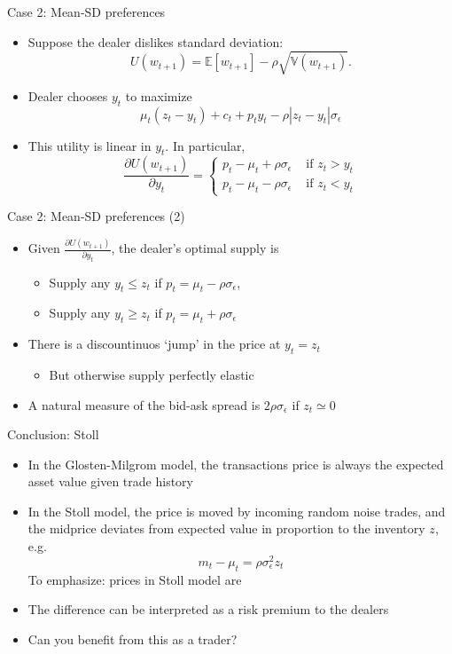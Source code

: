 \documentclass[english,10pt
,aspectratio=169
]{beamer}
\begin{document}
\begin{frame}{Case 2: Mean-SD preferences}
	\begin{itemize}
		\item Suppose the dealer dislikes standard deviation:
		\[
		U(w_{t+1})=\mathbb{E}[w_{t+1}] - \rho \sqrt{\mathbb{V}(w_{t+1})}.
		\]
		\item Dealer chooses $y_t$ to maximize
		\[
		\mu_t (z_t - y_t) + c_t + p_t y_t - \rho |z_t - y_t|\sigma_\epsilon
		\]
		\item This utility is linear in $y_t$. In particular,
		\[
		\frac{\partial U(w_{t+1})}{\partial y_t}= \left\{
		\begin{aligned}
		p_t-\mu_t+\rho\sigma_{\epsilon}	& \text{ if } z_t>y_t \\
		p_t-\mu_t-\rho\sigma_{\epsilon}	& \text{ if } z_t<y_t 
		\end{aligned}
		\right.
		\]
	\end{itemize}
\end{frame}


\begin{frame}{Case 2: Mean-SD preferences (2)}
	\begin{itemize}
		\item Given $\frac{\partial U(w_{t+1})}{\partial y_t}$, the dealer's optimal supply is
		\begin{itemize}
			\item Supply any $y_t \leq z_t$ if $p_t = \mu_t - \rho\sigma_{\epsilon}$,
			\item Supply any $y_t \geq z_t$ if $p_t = \mu_t + \rho\sigma_{\epsilon}$
		\end{itemize}
		\item There is a discountinuos `jump' in the price at $y_t=z_t$
		\begin{itemize}
			\item But otherwise supply perfectly elastic
		\end{itemize}
		\item A natural measure of the bid-ask spread is $2\rho\sigma_{\epsilon}$ if $z_t \simeq 0$
	\end{itemize}
\end{frame}


\begin{frame}{Conclusion: Stoll}
	\begin{itemize}
		\item In the Glosten-Milgrom model, the transactions price is always the expected asset value given trade history
		\item In the Stoll model, the price is moved by incoming random noise trades, and the midprice deviates from expected value in proportion to the inventory $z$, e.g.
		\[
		m_t - \mu_t = \rho \sigma^2_\epsilon z_t
		\]
		To emphasize: prices in Stoll model are 
		\item The difference can be interpreted as a risk premium to the  dealers
		\item Can you benefit from this as a trader? \pause {}
	\end{itemize}
\end{frame}
\end{document}
